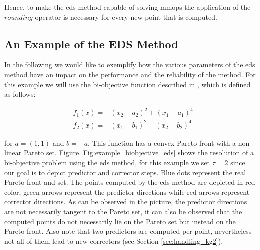 Hence, to make the \gls{eds} method capable of solving \glspl{mmop} the application of the $rounding$ operator is necessary for every new point that is computed.

\subsection{An Example of the EDS Method}

In the following we would like to exemplify how the various parameters of the \gls{eds} method have an impact on the performance and the reliability of the method. For this example we will use the bi-objective function described in \cite{box_algorithm}, which is defined as follows:

\begin{eqnarray}
& f_1(x) = & (x_2 - a_2)^2 + (x_1 - a_1)^4 \nonumber\\
& f_2(x) =  & (x_1 - b_1)^2 + (x_2 - b_2)^4
\label{eq:biobjective3}
\end{eqnarray}

for $a = (1, 1)$ and $b = -a$. This function has a convex Pareto front with a non-linear Pareto set. Figure \ref{Fig:example_biobjective_eds} shows the resolution of a bi-objective problem using the \gls{eds} method, for this example we set $\tau = 2$ since our goal is to depict predictor and corrector steps. Blue dots represent the real Pareto front and set. The points computed by the \gls{eds} method are depicted in red color, green arrows represent the predictor directions while red arrows represent corrector directions. As can be observed in the picture, the predictor directions are not necessarily tangent to the Pareto set, it can also be observed that the computed points do not necessarily lie on the Pareto set but instead on the Pareto front. Also note that two predictors are computed per point, nevertheless not all of them lead to new correctors (see Section \ref{sec:handling_kg2}).

\begin{comment}

\begin{figure}[H]
    \subfloat[Objective space \label{Fig:example_biobjective3_pf}]{%
    	\centering \texttt{[image: img/biobjective3\_front.png]}
    }
    \hfill
    \subfloat[Decision space \label{Fig:example_biobjective3_ps}]{%
    	\centering \texttt{[image: img/biobjective3\_set.png]}
    }
    \caption{Resolution of a bi-objective problem by using the EDS method}
    \label{Fig:example_biobjective_eds}
\end{figure}

\end{comment}

